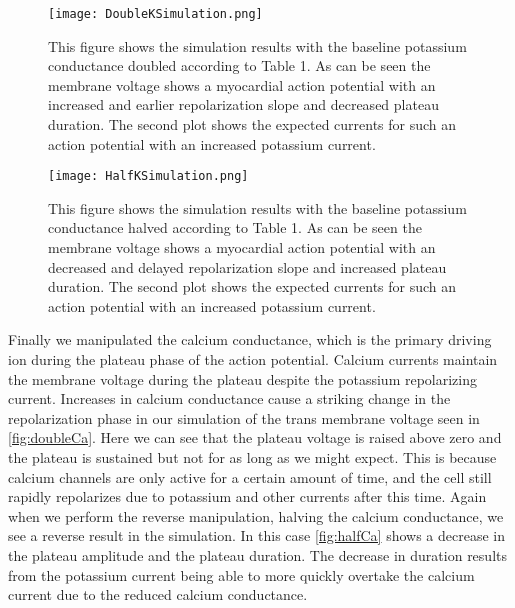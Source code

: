 \documentclass[12pt]{article}
\begin{document}
\begin{figure}[H]
	\centering
	\centering
	\texttt{[image: DoubleKSimulation.png]}
	
	\caption{This figure shows the simulation results with the baseline potassium conductance doubled according to Table 1. As can be seen the membrane voltage shows a myocardial action potential with an increased and earlier repolarization slope and decreased plateau duration. The second plot shows the expected currents for such an action potential with an increased potassium current. }
	\label{fig:doubleK}
\end{figure}
\begin{figure}[H]
	\centering
	\centering
	\texttt{[image: HalfKSimulation.png]}
	
	\caption{This figure shows the simulation results with the baseline potassium conductance halved according to Table 1. As can be seen the membrane voltage shows a myocardial action potential with an decreased and delayed repolarization slope and increased plateau duration. The second plot shows the expected currents for such an action potential with an increased potassium current. }
	\label{fig:halfK}
\end{figure}


\par{}
Finally we manipulated the calcium conductance, which is the primary driving ion during the plateau phase of the action potential. Calcium currents maintain the membrane voltage during the plateau despite the potassium repolarizing current. Increases in calcium conductance cause a striking change in the repolarization phase in our simulation of the trans membrane voltage seen in \ref{fig:doubleCa}. Here we can see that the plateau voltage is raised above zero and the plateau is sustained but not for as long as we might expect. This is because calcium channels are only active for a certain amount of time, and the cell still rapidly repolarizes due to potassium and other currents after this time. Again when we perform the reverse manipulation, halving the calcium conductance, we see a reverse result in the simulation. In this case \ref{fig:halfCa} shows a decrease in the plateau amplitude and the plateau duration. The decrease in duration results from the potassium current being able to more quickly overtake the calcium current due to the reduced calcium conductance.
\end{document}
